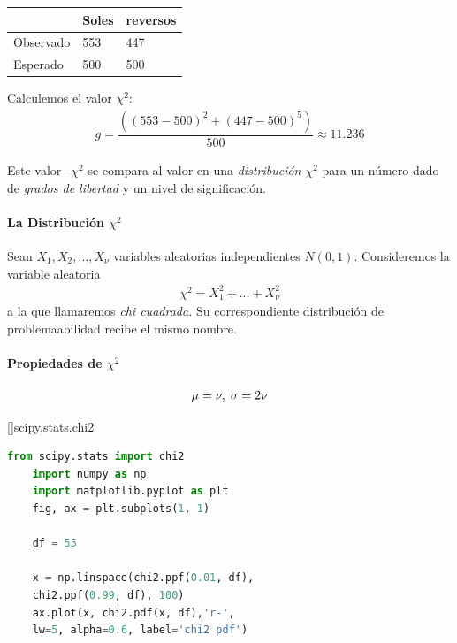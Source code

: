 \begin{center}
	\begin{tabular}{|l|l|l|}\hline
		& Soles & reversos\\\hline
		Observado & 553 & 447\\\hline
		Esperado & 500 & 500\\\hline
	\end{tabular}
\end{center}


Calculemos el valor $\chi^{2}:$
\begin{align}
	g = \dfrac{\left( \left( 553-500 \right)^{2}+\left( 447-500 \right)^{5} \right)}{500}\approx 11.236
\end{align}



Este valor$-\chi^{2}$ se compara al valor en una \emph{distribución $\chi^{2}$} para un número dado de \emph{grados de libertad} y un nivel de significación.

\paragraph{La Distribución $\chi^{2}$}
Sean $X_{1},X_{2},...,X_{\nu}$ variables aleatorias independientes $N(0,1).$
Consideremos la variable aleatoria
\begin{align}
	\label{outline:19}
	\chi^{2}=X_{1}^{2}+...+X_{\nu}^{2}
\end{align}
a la que llamaremos \emph{chi cuadrada.} Su correspondiente distribución de problemaabilidad recibe el mismo nombre.

\paragraph{Propiedades de $\chi^{2}$}
\begin{align}
	\label{eq:22}
	\mu=\nu, \; \sigma = 2\nu
\end{align}


[]{scipy.stats.chi2}
\begin{lstlisting}[language=Python]
	from scipy.stats import chi2
	import numpy as np
	import matplotlib.pyplot as plt
	fig, ax = plt.subplots(1, 1)
	
	df = 55
	
	x = np.linspace(chi2.ppf(0.01, df),
	chi2.ppf(0.99, df), 100)
	ax.plot(x, chi2.pdf(x, df),'r-',
	lw=5, alpha=0.6, label='chi2 pdf')
\end{lstlisting}



